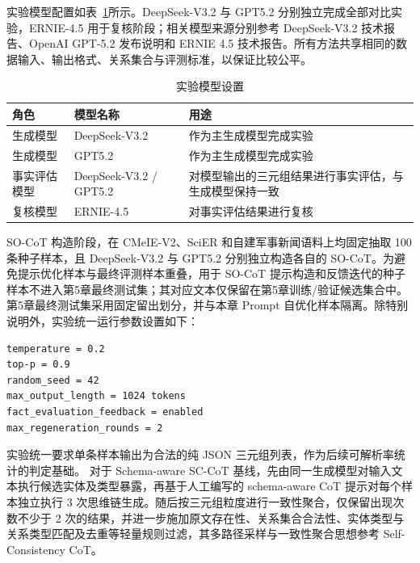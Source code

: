 实验模型配置如表~\ref{tab:exp_model_settings}所示。DeepSeek-V3.2 与 GPT5.2 分别独立完成全部对比实验，ERNIE-4.5 用于复核阶段；相关模型来源分别参考 DeepSeek-V3.2 技术报告、OpenAI GPT-5.2 发布说明和 ERNIE 4.5 技术报告\cite{DeepSeekAI2025DeepSeekV32,OpenAI2025GPT52,BaiduERNIE2025TechnicalReport}。所有方法共享相同的数据输入、输出格式、关系集合与评测标准，以保证比较公平。

\begin{table}[htbp]
  \centering
  \caption{实验模型设置}
  \label{tab:exp_model_settings}
  {\renewcommand{\arraystretch}{1.18}
  \small
  \setlength{\tabcolsep}{4pt}
  \begin{tabularx}{0.98\textwidth}{
    >{\raggedright\arraybackslash}p{}
    >{\raggedright\arraybackslash}p{}
    >{\raggedright\arraybackslash}X
  }
    \toprule
    角色 & 模型名称 & 用途 \\
    \midrule
    生成模型
    & DeepSeek-V3.2
    & 作为主生成模型完成实验 \\

    生成模型
    & GPT5.2
    & 作为主生成模型完成实验 \\

    事实评估模型
    & DeepSeek-V3.2 / GPT5.2
    & 对模型输出的三元组结果进行事实评估，与生成模型保持一致 \\

    复核模型
    & ERNIE-4.5
    & 对事实评估结果进行复核 \\
    \bottomrule
  \end{tabularx}}
\end{table}

SO-CoT 构造阶段，在 CMeIE-V2、SciER 和自建军事新闻语料上均固定抽取 100 条种子样本，且 DeepSeek-V3.2 与 GPT5.2 分别独立构造各自的 SO-CoT。为避免提示优化样本与最终评测样本重叠，用于 SO-CoT 提示构造和反馈迭代的种子样本不进入第5章最终测试集；其对应文本仅保留在第5章训练/验证候选集合中。第5章最终测试集采用固定留出划分，并与本章 Prompt 自优化样本隔离。除特别说明外，实验统一运行参数设置如下：

\begin{lstlisting}[style=promptbox]
temperature = 0.2
top-p = 0.9
random_seed = 42
max_output_length = 1024 tokens
fact_evaluation_feedback = enabled
max_regeneration_rounds = 2
\end{lstlisting}

实验统一要求单条样本输出为合法的纯 JSON 三元组列表，作为后续可解析率统计的判定基础。
对于 Schema-aware SC-CoT 基线，先由同一生成模型对输入文本执行候选实体及类型暴露，再基于人工编写的 schema-aware CoT 提示对每个样本独立执行 3 次思维链生成。随后按三元组粒度进行一致性聚合，仅保留出现次数不少于 2 次的结果，并进一步施加原文存在性、关系集合合法性、实体类型与关系类型匹配及去重等轻量规则过滤，其多路径采样与一致性聚合思想参考 Self-Consistency CoT\cite{Wang2023SelfConsistency}。

